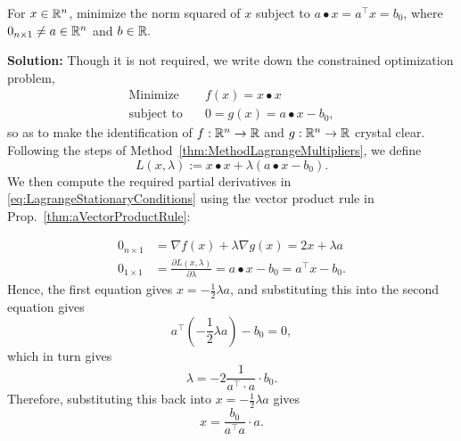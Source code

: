     
\begin{example} For $x \in \mathbb R^n$, minimize the norm squared of $x$ subject to $a \bullet x = a^\top x = b_0$, where $0_{n \times 1} \neq a \in \mathbb R^n$ and $b\in \mathbb R.$

\end{example}

\textbf{Solution:} Though it is not required, we write down the constrained optimization problem,
\begin{align*}
\text{Minimize} \quad & f(x)=x \bullet x\\
\text{subject to} \quad & 0 = g(x) = a \bullet x -b_0,
\end{align*}
so as to make the identification of $f:\mathbb R^n \to \mathbb R$ and $g:\mathbb R^n \to \mathbb R$ crystal clear. Following the steps of Method~\ref{thm:MethodLagrangeMultipliers}, we define
$$L(x, \lambda):= x \bullet x + \lambda \left( a \bullet x - b_0\right).$$
We then compute the required partial derivatives in \eqref{eq:LagrangeStationaryConditions} using the vector product rule in Prop.~\ref{thm:aVectorProductRule}:

\begin{align*}
  0_{n \times 1} & = \nabla f(x) + \lambda \nabla g(x) = 2x + \lambda a \\[1em]
     0_{1 \times 1} & = \frac{ \partial L(x, \lambda)}{\partial \lambda} =a\bullet x - b_0 = a^\top x -  b_0.
\end{align*}
Hence, the first equation gives $x = -\frac{1}{2}\lambda a$, and substituting this into the second equation gives 
$$
    a^\top \left(-\frac{1}{2}\lambda a \right)  -b_0 = 0,
$$
which in turn gives
$$ \lambda = -2 \frac{1}{a^\top \cdot a} \cdot b_0.$$
Therefore, substituting this back into $x = -\frac{1}{2}\lambda a$ gives
$$ x = \frac{b_0}{a^\top a} \cdot a.$$
\Qed







